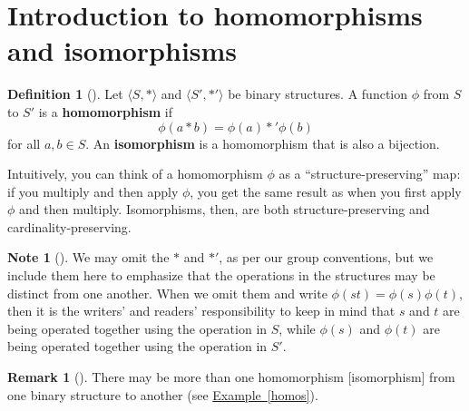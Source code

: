 \documentclass[10pt,]{book}
\newcommand{\terminology}[1]{\textbf{#1}}
\theoremstyle{plain}
\theoremstyle{definition}
\newtheorem{definition}[theorem]{Definition}
\theoremstyle{definition}
\newtheorem{remark}[theorem]{Remark}
\newtheorem{note}[theorem]{Note}
\theoremstyle{definition}
\theoremstyle{definition}
\numberwithin{equation}{section}
\begin{document}
\section[{Introduction to homomorphisms and isomorphisms}]{Introduction to homomorphisms and isomorphisms}\label{section-11}
\begin{definition}[{}]\label{definition-31}
Let \(\langle S,*\rangle\) and \(\langle S',*'\rangle\) be binary structures. A function \(\phi\) from \(S\) to \(S'\) is a \terminology{homomorphism} if%
\begin{equation*}
\phi(a* b)=\phi(a)*'\phi(b)
\end{equation*}
for all \(a,b\in S\). An \terminology{isomorphism} is a homomorphism that is also a bijection.%
\end{definition}
Intuitively, you can think of a homomorphism \(\phi\) as a ``structure-preserving'' map: if you multiply and then apply \(\phi\), you get the same result as when you first apply \(\phi\) and then multiply. Isomorphisms, then, are both structure-preserving and cardinality-preserving.%
\begin{note}[]\label{note-5}
We may omit the \(*\) and \(*'\), as per our group conventions, but we include them here to emphasize that the operations in the structures may be distinct from one another. When we omit them and write \(\phi(st)=\phi(s)\phi(t)\), then it is the writers' and readers' responsibility to keep in mind that \(s\) and \(t\) are being operated together using the operation in \(S\), while \(\phi(s)\) and \(\phi(t)\) are being operated together using the operation in \(S'\).%
\end{note}
\begin{remark}[]\label{remark-16}
There may be more than one homomorphism [isomorphism] from one binary structure to another (see \hyperref[homos]{Example~\ref{homos}}).%
\end{remark}
\end{document}
